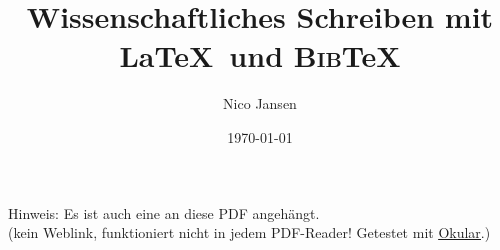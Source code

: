 \documentclass[aspectratio=169]{beamer}
\title{Wissenschaftliches Schreiben mit \LaTeX~und \textsc{Bib}\TeX}
\author{Nico Jansen}
\date{\today}
\newif\iflightmode
\begin{document}
        \begin{frame}
            \maketitle
            \iflightmode
            \else
                \textcolor{foreground-secondary}{
                    Hinweis: Es ist auch eine 
                    an diese PDF angehängt. \\
                    (kein Weblink, funktioniert nicht in jedem PDF-Reader! Getestet mit \href{https://okular.kde.org)}{\alert{\underline{Okular}}}.)
                }
            \fi
        \end{frame}

    
        
\end{document}
